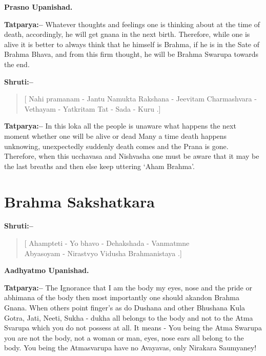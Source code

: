 \begin{flushright}
\textbf{Prasno Upanishad.}
\end{flushright}

\textbf{Tatparya:–} Whatever thoughts and feelings one is thinking about at the time of death, accordingly, he will get gnana in the next birth. Therefore, while one is alive it is better to always think that he himself is Brahma, if he is in the Sate of Brahma Bhava, and from this firm thought, he will be Brahma Swarupa towards the end.

\textbf{Shruti:–}

\begin{verse}
[ Nahi pramanam - Jantu Namukta Rakshana - Jeevi\break tam  Charmashvara - Vethayam - Yatkritam Tat - Sada - Kuru .]
\end{verse}

\textbf{Tatparya:–} In this loka all the people is unaware what happens the next moment whether one will be alive or dead Many a time death happens unknowing, unexpectedly suddenly death comes and the Prana is gone. Therefore, when this ucchavasa and Nishvasha one must be aware that it may be the last breaths and then else keep uttering ‘Aham Brahma’.

\chapter{Brahma Sakshatkara}

\textbf{Shruti:–}

\begin{verse}
[ Ahampteti - Yo bhavo - Dehakshada - Vanmatmne \\ Abyasoyam - Nirastvyo Vidusha Brahmanistaya .]
\end{verse}

\begin{flushright}
\textbf{Aadhyatmo Upanishad.}
\end{flushright}

\textbf{Tatparya:–} The Ignorance that I am the body my eyes, nose and the pride or abhimana of the body then most importantly one should akandon Brahma Gnana. When others point finger's as do Dushana and other Bhushana Kula Gotra, Jati, Neeti, Sukha - dukha all belongs to the body and not to the Atma Svarupa which you do not possess at all. It means - You being the Atma Swarupa you are not the body, not a woman or man, eyes, nose ears all belong to the body. You being the Atmasvarupa have no Avayavas, only Nirakara Saumyaney!

